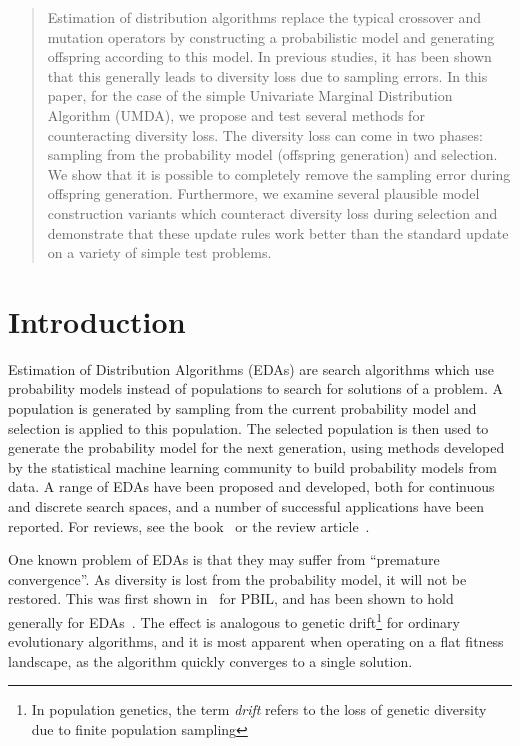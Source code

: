 \documentclass{acm_proc_article-sp}
\begin{document}
\begin{abstract}
  Estimation of distribution algorithms replace the typical crossover and
  mutation operators by constructing a probabilistic model and generating
  offspring according to this model. In previous studies, it has been shown
  that this generally leads to diversity loss due to sampling errors. In this
  paper, for the case of the simple Univariate Marginal Distribution Algorithm
  (UMDA), we propose and test several methods for counteracting diversity loss.
  The diversity loss can come in two phases: sampling from the probability
  model (offspring generation) and selection. We show that it is possible to
  completely remove the sampling error during offspring generation.
  Furthermore, we examine several plausible model construction variants which
  counteract diversity loss during selection and demonstrate that these update
  rules work better than the standard update on a variety of simple test
  problems.
\end{abstract}



\section{Introduction}
\label{sec:intro}

Estimation of Distribution Algorithms (EDAs) are search algorithms
which use probability models instead of populations to search for
solutions of a problem. A population is generated by sampling from the
current probability model and selection is applied to this population.
The selected population is then used to generate the probability model for
the next generation, using methods developed by the statistical
machine learning community to build probability models from data.  A
range of EDAs have been proposed and developed, both for continuous
and discrete search spaces, and a number of successful applications
have been reported. For reviews, see the book~\cite{Larranaga2001} or
the review article~\cite{Pelikan:02}.

One known problem of EDAs is that they may suffer from ``premature
convergence''. As diversity is lost from the probability model, it
will not be restored. This was first shown
in~\cite{Gonzalez2002,Shapiro2003a} for PBIL, and has been shown to
hold generally for EDAs~\cite{Shapiro2006}.  The effect is analogous to genetic
drift\footnote{In population genetics, the term {\em drift} refers to
  the loss of genetic diversity due to finite population sampling} for
ordinary evolutionary algorithms, and it is most apparent when
operating on a flat fitness landscape, as the algorithm quickly
converges to a single solution.
\end{document}

